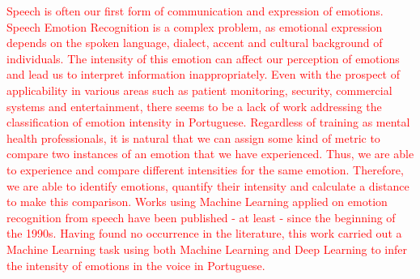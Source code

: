 \textcolor{red}{Speech is often our first form of communication and expression of emotions. Speech Emotion Recognition is a complex problem, as emotional expression depends on the spoken language, dialect, accent and cultural background of individuals. The intensity of this emotion can affect our perception of emotions and lead us to interpret information inappropriately. Even with the prospect of applicability in various areas such as patient monitoring, security, commercial systems and entertainment, there seems to be a lack of work addressing the classification of emotion intensity in Portuguese. Regardless of training as mental health professionals, it is natural that we can assign some kind of metric to compare two instances of an emotion that we have experienced. Thus, we are able to experience and compare different intensities for the same emotion. Therefore, we are able to identify emotions, quantify their intensity and calculate a distance to make this comparison. Works using Machine Learning applied on emotion recognition from speech have been published - at least - since the beginning of the 1990s. Having found no occurrence in the literature, this work carried out a Machine Learning task using both Machine Learning and Deep Learning to infer the intensity of emotions in the voice in Portuguese.}